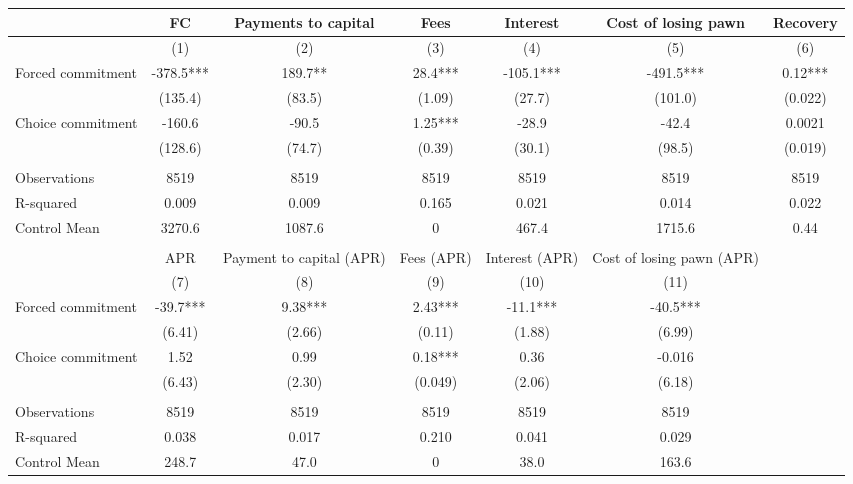 \begin{tabular}{lcccccc}
\toprule
      & FC    & Payments to capital & Fees  & Interest & Cost of losing pawn & Recovery \\
\midrule
      & (1)   & (2)   & (3)   & (4)   & (5)   & (6) \\
\midrule
\midrule
Forced commitment & -378.5*** & 189.7** & 28.4*** & -105.1*** & -491.5*** & 0.12*** \\
      & (135.4) & (83.5) & (1.09) & (27.7) & (101.0) & (0.022) \\
Choice commitment & -160.6 & -90.5 & 1.25*** & -28.9 & -42.4 & 0.0021 \\
      & (128.6) & (74.7) & (0.39) & (30.1) & (98.5) & (0.019) \\
      &       &       &       &       &       &  \\
\midrule
Observations & 8519  & 8519  & 8519  & 8519  & 8519  & 8519 \\
R-squared & 0.009 & 0.009 & 0.165 & 0.021 & 0.014 & 0.022 \\
Control Mean & 3270.6 & 1087.6 & 0     & 467.4 & 1715.6 & 0.44 \\
\midrule
\midrule
      &       &       &       &       &       &  \\
\midrule
      & APR   & Payment to capital (APR) & Fees (APR) & Interest (APR) & Cost of losing pawn (APR) &  \\
\midrule
      & (7)   & (8)   & (9)   & (10)  & (11)  &  \\
\midrule
\midrule
Forced commitment & -39.7*** & 9.38*** & 2.43*** & -11.1*** & -40.5*** &  \\
      & (6.41) & (2.66) & (0.11) & (1.88) & (6.99) &  \\
Choice commitment & 1.52  & 0.99  & 0.18*** & 0.36  & -0.016 &  \\
      & (6.43) & (2.30) & (0.049) & (2.06) & (6.18) &  \\
      &       &       &       &       &       &  \\
\midrule
Observations & 8519  & 8519  & 8519  & 8519  & 8519  &  \\
R-squared & 0.038 & 0.017 & 0.210 & 0.041 & 0.029 &  \\
Control Mean & 248.7 & 47.0  & 0     & 38.0  & 163.6 &  \\
\bottomrule
\bottomrule
\end{tabular}%
